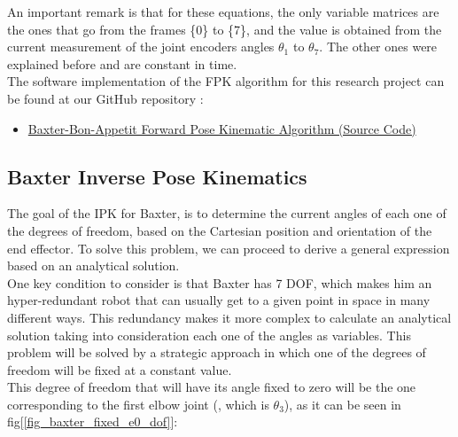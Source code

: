 \documentclass[11pt]{report} %
\begin{document}
An important remark is that for these equations, the only variable matrices are the ones that go from the frames \{0\} to \{7\}, and the value is obtained from the current measurement of the joint encoders angles $\theta_{1}$ to $\theta_{7}$. The other ones were explained before and are constant in time.\\

The software implementation of the FPK algorithm for this research project can be found at our GitHub repository :

\begin{itemize}
    \color{blue}
    \item \href{https://github.com/san99tiago/baxter-bon-appetit/blob/main/python/baxter_bon_appetit/src/baxter_essentials/baxter_fpk.py}{Baxter-Bon-Appetit Forward Pose Kinematic Algorithm (Source Code)}
\end{itemize}


\subsection{Baxter Inverse Pose Kinematics} 
\label{sub_sec_ipk}

The goal of the IPK for Baxter, is to determine the current angles of each one of the degrees of freedom, based on the Cartesian position and orientation of the end effector. To solve this problem, we can proceed to derive a general expression based on an analytical solution.\\

One key condition to consider is that Baxter has 7 DOF, which makes him an hyper-redundant robot that can usually get to a given point in space in many different ways. This redundancy makes it more complex to calculate an analytical solution taking into consideration each one of the angles as variables. This problem will be solved by a strategic approach in which one of the degrees of freedom will be fixed at a constant value.\\

This degree of freedom that will have its angle fixed to zero will be the one corresponding to the first elbow joint (, which is $\theta_{3}$), as it can be seen in fig[\ref{fig_baxter_fixed_e0_dof}]:
\end{document}
